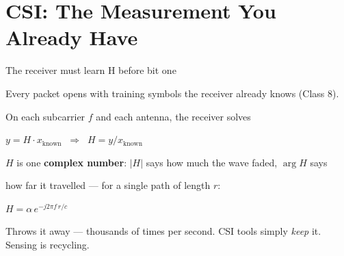 
\section[CSI]{CSI: The Measurement You Already Have}


\begin{frame}{The receiver must learn H before bit one}
  \vspace{0.3em}
  {\small Every packet opens with training symbols the receiver already knows
   (Class 8).\par}
  \vspace{0.3em}
  {\small On each subcarrier $f$ and each antenna, the receiver solves\par}
  \vspace{0.2em}
  \centering
  {\large $y = H \cdot x_{\text{known}} \;\;\Rightarrow\;\;
    H = y / x_{\text{known}}$\par}
  \vspace{0.6em}
  \raggedright
  {\small $H$ is one \textbf{complex number}: $|H|$ says how much the wave faded,
   $\arg H$ says\par}
  {\small how far it travelled --- for a single path of length $r$:\par}
  \vspace{0.2em}
  \centering
  {\large $H = \alpha\, e^{-j 2\pi f\, r/c}$
   \quad{\small\textcolor{softgray}{(one turn of phase per wavelength of $r$)}}\par}

  \vspace{0.7em}
     {Throws it away --- thousands of times per second. CSI tools simply
      \emph{keep} it. Sensing is recycling.}

\end{frame}


